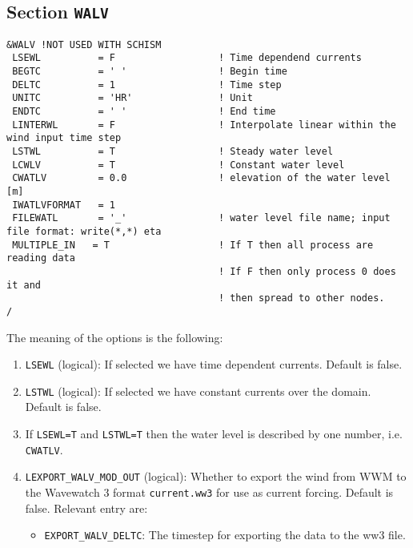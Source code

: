 \documentclass[12pt]{amsart}
\begin{document}
\subsection{Section {\tt WALV}}
\begin{verbatim}
&WALV !NOT USED WITH SCHISM
 LSEWL          = F                  ! Time dependend currents
 BEGTC          = ' '                ! Begin time
 DELTC          = 1                  ! Time step
 UNITC          = 'HR'               ! Unit
 ENDTC          = ' '                ! End time
 LINTERWL       = F                  ! Interpolate linear within the wind input time step
 LSTWL          = T                  ! Steady water level
 LCWLV          = T                  ! Constant water level
 CWATLV         = 0.0                ! elevation of the water level [m]
 IWATLVFORMAT   = 1
 FILEWATL       = '_'                ! water level file name; input file format: write(*,*) eta
 MULTIPLE_IN   = T                   ! If T then all process are reading data
                                     ! If F then only process 0 does it and
                                     ! then spread to other nodes.
/
\end{verbatim}



The meaning of the options is the following:
\begin{enumerate}
\item {\tt LSEWL} (logical): If selected we have time dependent currents. Default is false.
\item {\tt LSTWL} (logical): If selected we have constant currents over the domain. Default is false.
\item If {\tt LSEWL=T} and {\tt LSTWL=T} then the water level is described by one number, i.e. {\tt CWATLV}.
\item {\tt LEXPORT\_WALV\_MOD\_OUT} (logical): Whether to export the wind from WWM to the Wavewatch 3 format {\tt current.ww3} for use as current forcing. Default is false. Relevant entry are:
  \begin{itemize}
  \item {\tt EXPORT\_WALV\_DELTC}: The timestep for exporting the data to the ww3 file.
  \end{itemize}
\end{enumerate}
\end{document}
